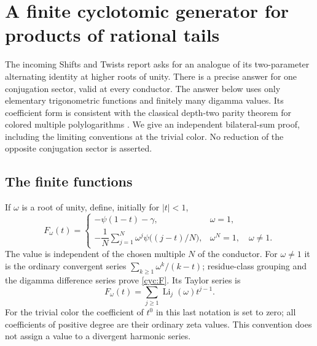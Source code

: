 \section{A finite cyclotomic generator for products of rational tails}
\label{cyc:sec}

The incoming Shifts and Twists report \cite{HTST} asks for an analogue of its two-parameter
alternating identity at higher roots of unity.  There is a precise answer
for one conjugation sector, valid at every conductor.  The answer below
uses only elementary trigonometric functions and finitely many digamma
values.  Its coefficient form is consistent with the classical
depth-two parity theorem for colored multiple polylogarithms
\cite{PanzerParity}.  We give an independent bilateral-sum proof, including
the limiting conventions at the trivial color.  No reduction of the
opposite conjugation sector is asserted.

\subsection{The finite functions}

If $\omega$ is a root of unity, define, initially for $|t|<1$,
\begin{equation}\label{cyc:F}
 F_\omega(t)=\begin{cases}
 -\psi(1-t)-\gamma,&\omega=1,\\[2pt]
 -\dfrac1N\displaystyle\sum_{j=1}^N\omega^j
                  \psi\bigl((j-t)/N\bigr),
       &\omega^N=1,\quad\omega\ne1.
 \end{cases}
\end{equation}
The value is independent of the chosen multiple $N$ of the conductor.
For $\omega\ne1$ it is the ordinary convergent series
$\sum_{k\ge1}\omega^k/(k-t)$; residue-class grouping and the digamma
difference series prove \eqref{cyc:F}.  Its Taylor series is
\[
 F_\omega(t)=\sum_{j\ge1}\operatorname{Li}_j(\omega)t^{j-1}.
\]
For the trivial color the coefficient of $t^0$ in this last notation is
set to zero; all coefficients of positive degree are their ordinary
zeta values.  This convention does not assign a value to a divergent
harmonic series.


